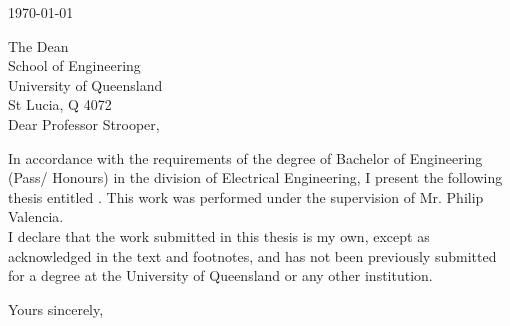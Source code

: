\begin{flushright}
	
	\medskip
	\today
\end{flushright}
\begin{flushleft}
  The Dean\\
  School of Engineering\\
  University of Queensland\\
  St Lucia, Q 4072\\
  \bigskip\bigskip
  Dear Professor Strooper,
\end{flushleft}

In accordance with the requirements of the degree of Bachelor of
Engineering (Pass/ Honours) in the division of Electrical Engineering, I present the
following thesis entitled \Title . This work was performed  under the supervision of Mr. Philip Valencia.  \\

I declare that the work submitted in this thesis is my own, except as acknowledged in the text and footnotes, and has not been previously submitted for a degree at the University of Queensland or any other institution.

\begin{flushright}
	Yours sincerely,\\
	 \bigskip\bigskip\bigskip
	\Author
\end{flushright}
